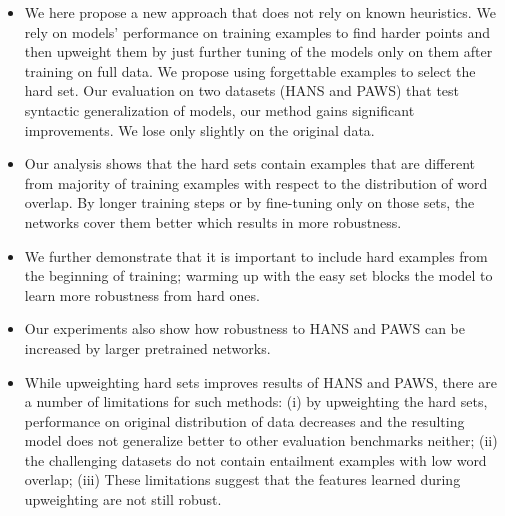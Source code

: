 \begin{itemize}
    \item We here propose a new approach that does not rely 
    on known heuristics. We rely on models' performance on training examples to find harder points and then upweight them by just further tuning of the models only on them after training on full data.
    We propose using forgettable examples to select the hard set. Our evaluation on two datasets (HANS and PAWS) that test syntactic generalization of models, our method gains significant improvements. We lose only slightly on the original data.
    
    \item Our analysis shows that the hard sets contain examples that are different from majority of training examples with respect to the distribution of word overlap. 
    By longer training steps \cite{zhou2020instability} or by fine-tuning only on those sets, the networks cover them better which results in 
   more robustness.
    
    \item We further demonstrate that it is important to include hard examples from the beginning of training; warming up with the easy set blocks the model to learn more robustness from hard ones.
    
    \item Our experiments also show how robustness to HANS
    and PAWS can be increased by larger pretrained networks. 
    
    \item While upweighting hard sets improves results of HANS and PAWS, there are a number of limitations for such methods: (i)
    by upweighting the hard sets, performance on original distribution of data decreases and the resulting model does not generalize better 
    to other evaluation benchmarks neither; (ii) 
    the challenging
    datasets do not contain entailment examples with low word overlap; (iii) These limitations suggest that the features learned during upweighting are not still robust.
    
\end{itemize}


